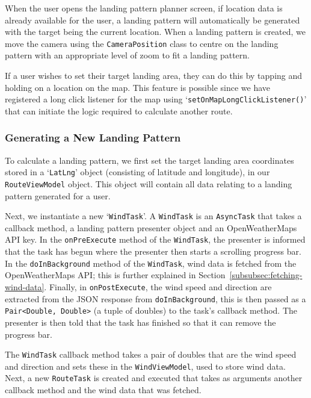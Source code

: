 When the user opens the landing pattern planner screen, if location data is already available for the user, a landing pattern will automatically be generated with the target being the current location. When a landing pattern is created, we move the camera using the \texttt{CameraPosition} class to centre on the landing pattern with an appropriate level of zoom to fit a landing pattern.

If a user wishes to set their target landing area, they can do this by tapping and holding on a location on the map. This feature is possible since we have registered a long click listener for the map using `\texttt{setOnMapLongClickListener()}' that can initiate the logic required to calculate another route.

\subsubsection{Generating a New Landing Pattern}
To calculate a landing pattern, we first set the target landing area coordinates stored in a `\texttt{LatLng}' object (consisting of latitude and longitude), in our \texttt{RouteViewModel} object. This object will contain all data relating to a landing pattern generated for a user.

Next, we instantiate a new `\texttt{WindTask}'. A \texttt{WindTask} is an \texttt{AsyncTask} that takes a callback method, a landing pattern presenter object and an OpenWeatherMaps API key. In the \texttt{onPreExecute} method of the \texttt{WindTask}, the presenter is informed that the task has begun where the presenter then starts a scrolling progress bar. In the \texttt{doInBackground} method of the \texttt{WindTask}, wind data is fetched from the OpenWeatherMaps API; this is further explained in Section~\vref{subsubsec:fetching-wind-data}. Finally, in \texttt{onPostExecute}, the wind speed and direction are extracted from the JSON response from \texttt{doInBackground}, this is then passed as a \texttt{Pair<Double, Double>} (a tuple of doubles) to the task's callback method. The presenter is then told that the task has finished so that it can remove the progress bar.

The \texttt{WindTask} callback method takes a pair of doubles that are the wind speed and direction and sets these in the \texttt{WindViewModel}, used to store wind data. Next, a new \texttt{RouteTask} is created and executed that takes as arguments another callback method and the wind data that was fetched.

